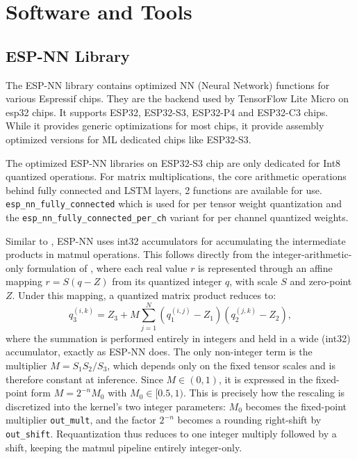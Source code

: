 \documentclass[12pt,DIV16,BCOR12mm,a4paper,footinclude=false,headinclude,parskip=half-,twoside,openright,cleardoublepage=empty,toc=index,bibliography=totoc,listof=totoc]{scrreprt}
\numberwithin{equation}{chapter}
\begin{document}
\section{Software and Tools}
  \subsection{ESP-NN Library}
  \label{sec:esp-nn}
  The ESP-NN library contains optimized NN (Neural Network) functions for various Espressif chips. They are the backend used
  by TensorFlow Lite Micro on esp32 chips. It supports ESP32, ESP32-S3, ESP32-P4 and ESP32-C3 chips. While it provides
  generic optimizations for most chips, it provide assembly optimized versions for ML dedicated chips like ESP32-S3.

  The optimized ESP-NN libraries on ESP32-S3 chip are only dedicated for Int8 quantized operations. For matrix multiplications,
  the core arithmetic operations behind fully connected and LSTM layers, 2 functions are available for use.
  \texttt{esp\_nn\_fully\_connected} which is used for per tensor weight quantization and the \texttt{esp\_nn\_fully\_connected\_per\_ch} variant for per channel quantized weights.

  Similar to \cite{jacobQuantizationTrainingNeural2017}, ESP-NN uses int32 accumulators for accumulating the intermediate products in matmul operations.
  This follows directly from the integer-arithmetic-only formulation of \cite{jacobQuantizationTrainingNeural2017}, where each real value $r$ is represented
  through an affine mapping $r = S(q - Z)$ from its quantized integer $q$, with scale $S$ and zero-point $Z$. Under this mapping, a quantized matrix product
  reduces to:
  \begin{equation}
    q_3^{(i,k)} = Z_3 + M \sum_{j=1}^{N} \left(q_1^{(i,j)} - Z_1\right)\left(q_2^{(j,k)} - Z_2\right),
  \end{equation}
  where the summation is performed entirely in integers and held in a wide (int32) accumulator, exactly as ESP-NN does. The only non-integer term is the
  multiplier $M = S_1 S_2 / S_3$, which depends only on the fixed tensor scales and is therefore constant at inference. Since $M \in (0,1)$, it is expressed
  in the fixed-point form $M = 2^{-n} M_0$ with $M_0 \in [0.5, 1)$. This is precisely how the rescaling is discretized into the kernel's two integer parameters:
  $M_0$ becomes the fixed-point multiplier \texttt{out\_mult}, and the factor $2^{-n}$ becomes a rounding right-shift by \texttt{out\_shift}. Requantization thus
  reduces to one integer multiply followed by a shift, keeping the matmul pipeline entirely integer-only.
  
\end{document}
